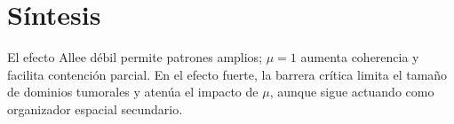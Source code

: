 \section{Síntesis}
El efecto Allee débil permite patrones amplios; $\mu=1$ aumenta coherencia y facilita contención parcial. En el efecto fuerte, la barrera crítica limita el tamaño de dominios tumorales y atenúa el impacto de $\mu$, aunque sigue actuando como organizador espacial secundario.



















